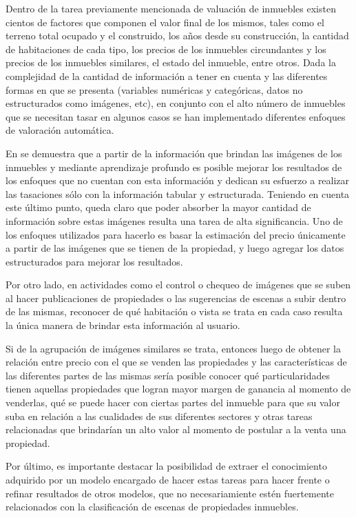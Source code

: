 Dentro de la tarea previamente mencionada de valuación de inmuebles existen cientos de factores que componen el valor final de los mismos, tales como el terreno total ocupado y el construido, los años desde su construcción, la cantidad de habitaciones de cada tipo, los precios de los inmuebles circundantes y los precios de los inmuebles similares, el estado del inmueble, entre otros. Dada la complejidad de la cantidad de información a tener en cuenta y las diferentes formas en que se presenta (variables numéricas y categóricas, datos no estructurados como imágenes, etc), en conjunto con el alto número de inmuebles que se necesitan tasar en algunos casos se han implementado diferentes enfoques de valoración automática.

En \cite{vision_based_real_estate_price_estimation} se demuestra que a partir de la información que brindan las imágenes de los inmuebles y mediante aprendizaje profundo es posible mejorar los resultados de los enfoques que no cuentan con esta información y dedican su esfuerzo a realizar las tasaciones sólo con la información tabular y estructurada. 
Teniendo en cuenta este último punto, queda claro que poder absorber la mayor cantidad de información sobre estas imágenes resulta una tarea de alta significancia. Uno de los enfoques utilizados para hacerlo es basar la estimación del precio únicamente a partir de las imágenes que se tienen de la propiedad, y luego agregar los datos estructurados para mejorar los resultados.

Por otro lado, en actividades como el control o chequeo de imágenes que se suben al hacer publicaciones de propiedades o las sugerencias de escenas a subir dentro de las mismas, reconocer de qué habitación o vista se trata en cada caso resulta la única manera de brindar esta información al usuario.

Si de la agrupación de imágenes similares se trata, entonces luego de obtener la relación entre precio con el que se venden las propiedades y las características de las diferentes partes de las mismas sería posible conocer qué particularidades tienen aquellas propiedades que logran mayor margen de ganancia al momento de venderlas, qué se puede hacer con ciertas partes del inmueble para que su valor suba en relación a las cualidades de sus diferentes sectores y otras tareas relacionadas que brindarían un alto valor al momento de postular a la venta una propiedad.

Por último, es importante destacar la posibilidad de extraer el conocimiento adquirido por un modelo encargado de hacer estas tareas para hacer frente o refinar resultados de otros modelos, que no necesariamiente estén fuertemente relacionados con la clasificación de escenas de propiedades inmuebles.


